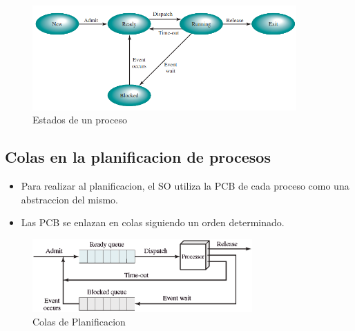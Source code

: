 \begin{figure}[h]
    \begin{center}
        \includegraphics[width=0.90\textwidth]{assets/estados.png}
    \end{center}
    \caption{Estados de un proceso}\label{fig:}
\end{figure}

\pagebreak
\subsection{Colas en la planificacion de procesos}
\begin{itemize}
    \item Para realizar al planificacion, el SO utiliza la PCB de cada proceso como una abstraccion del mismo.
    \item Las PCB se enlazan en colas siguiendo un orden determinado.
\end{itemize}
\begin{figure}[h]
    \begin{center}
        \includegraphics[width=0.75\textwidth]{assets/ProcessQueue.eps}
    \end{center}
    \caption{Colas de Planificacion}\label{fig:}
\end{figure}


